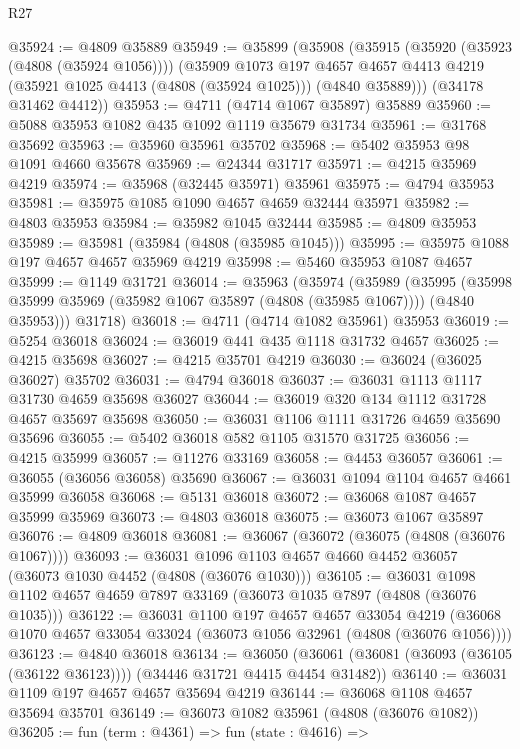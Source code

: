 \begin{lexlean}{R27}
\begin{coremodule}
@35924 := @4809 @35889
@35949 := @35899
    (@35908
      (@35915
        (@35920 (@35923 (@4808 (@35924 @1056))))
        (@35909
          @1073
          @197
          @4657
          @4657
          @4413
          @4219
          (@35921 @1025 @4413 (@4808 (@35924 @1025)))
          (@4840 @35889)))
      (@34178 @31462 @4412))
@35953 := @4711 (@4714 @1067 @35897) @35889
@35960 := @5088 @35953 @1082 @435 @1092 @1119 @35679 @31734
@35961 := @31768 @35692
@35963 := @35960 @35961 @35702
@35968 := @5402 @35953 @98 @1091 @4660 @35678
@35969 := @24344 @31717
@35971 := @4215 @35969 @4219
@35974 := @35968 (@32445 @35971) @35961
@35975 := @4794 @35953
@35981 := @35975 @1085 @1090 @4657 @4659 @32444 @35971
@35982 := @4803 @35953
@35984 := @35982 @1045 @32444
@35985 := @4809 @35953
@35989 := @35981 (@35984 (@4808 (@35985 @1045)))
@35995 := @35975 @1088 @197 @4657 @4657 @35969 @4219
@35998 := @5460 @35953 @1087 @4657
@35999 := @1149 @31721
@36014 := @35963
    (@35974
      (@35989
        (@35995 (@35998 @35999 @35969 (@35982 @1067 @35897 (@4808 (@35985 @1067)))) (@4840 @35953)))
      @31718)
@36018 := @4711 (@4714 @1082 @35961) @35953
@36019 := @5254 @36018
@36024 := @36019 @441 @435 @1118 @31732 @4657
@36025 := @4215 @35698
@36027 := @4215 @35701 @4219
@36030 := @36024 (@36025 @36027) @35702
@36031 := @4794 @36018
@36037 := @36031 @1113 @1117 @31730 @4659 @35698 @36027
@36044 := @36019 @320 @134 @1112 @31728 @4657 @35697 @35698
@36050 := @36031 @1106 @1111 @31726 @4659 @35690 @35696
@36055 := @5402 @36018 @582 @1105 @31570 @31725
@36056 := @4215 @35999
@36057 := @11276 @33169
@36058 := @4453 @36057
@36061 := @36055 (@36056 @36058) @35690
@36067 := @36031 @1094 @1104 @4657 @4661 @35999 @36058
@36068 := @5131 @36018
@36072 := @36068 @1087 @4657 @35999 @35969
@36073 := @4803 @36018
@36075 := @36073 @1067 @35897
@36076 := @4809 @36018
@36081 := @36067 (@36072 (@36075 (@4808 (@36076 @1067))))
@36093 := @36031 @1096 @1103 @4657 @4660 @4452 @36057 (@36073 @1030 @4452 (@4808 (@36076 @1030)))
@36105 := @36031 @1098 @1102 @4657 @4659 @7897 @33169 (@36073 @1035 @7897 (@4808 (@36076 @1035)))
@36122 := @36031
    @1100
    @197
    @4657
    @4657
    @33054
    @4219
    (@36068 @1070 @4657 @33054 @33024 (@36073 @1056 @32961 (@4808 (@36076 @1056))))
@36123 := @4840 @36018
@36134 := @36050
    (@36061 (@36081 (@36093 (@36105 (@36122 @36123)))) (@34446 @31721 @4415 @4454 @31482))
@36140 := @36031 @1109 @197 @4657 @4657 @35694 @4219
@36144 := @36068 @1108 @4657 @35694 @35701
@36149 := @36073 @1082 @35961 (@4808 (@36076 @1082))
@36205 := fun (term : @4361) =>
  fun (state : @4616) =>

\end{coremodule}
\end{lexlean}
